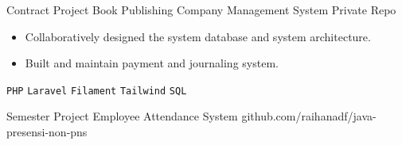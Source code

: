 \documentclass[9pt]{developercv} %
\begin{document}
\vspace{-10 pt}
\begin{entrylist}
	\entry
	{Contract Project}
	{Book Publishing Company Management System}
	{Private Repo}
	{
		\vspace{-10 pt}
		\begin{itemize}[noitemsep,topsep=0pt,parsep=0pt,partopsep=0pt, leftmargin=-1pt]
			\item {Collaboratively designed the system database and system architecture.}
			\item {Built and maintain payment and journaling system.}
		\end{itemize}
		\texttt{PHP} \slashsep \texttt{Laravel} \slashsep \texttt{Filament} \slashsep \texttt{Tailwind} \slashsep \texttt{SQL}
	}
	\entry
	{Semester Project}
	{Employee Attendance System}
	{github.com/raihanadf/java-presensi-non-pns}
	{\vspace{-10 pt}
		\begin{itemize}[noitemsep,topsep=0pt,parsep=0pt,partopsep=0pt, leftmargin=-1pt]


\end{itemize}}
\end{entrylist}
\end{document}
